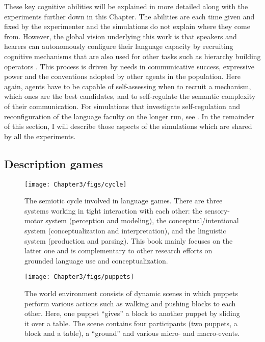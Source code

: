 These key cognitive abilities will be explained in more detailed along with the experiments further down in this Chapter. The abilities are each time given and fixed by the experimenter and the simulations do not explain where they come from. However, the global vision underlying this work is that speakers and hearers can autonomously configure their language capacity by recruiting cognitive mechanisms that are also used for other tasks such as hierarchy building operators \citep{steels07recruitment}. This process is driven by needs in communicative success, expressive power and the conventions adopted by other agents in the population. Here again, agents have to be capable of self-assessing when to recruit a mechanism, which ones are the best candidates, and to self-regulate the semantic complexity of their communication. For simulations that investigate self-regulation and reconfiguration of the language faculty on the longer run, see \citet{steels06how-grammar, steels07scaffolding}. In the remainder of this section, I will describe those aspects of the simulations which are shared by all the experiments.

\subsection{Description games}

\begin{figure}[p]
\centerline{\texttt{[image: Chapter3/figs/cycle]}}
  \caption[The semiotic cycle]{The semiotic cycle involved in language games. There are three systems working in tight interaction with each other: the sensory-motor system (perception and modeling), the conceptual/intentional system (conceptualization and interpretation), and the linguistic system (production and parsing). This book mainly focuses on the latter one and is complementary to other research efforts on grounded language use and conceptualization.}
   \label{f:cycle}
\end{figure}

\begin{figure}[p]
\centerline{\texttt{[image: Chapter3/figs/puppets]}}
  \caption[An example scene]{The world environment consists of dynamic scenes in which puppets perform various actions such as walking and pushing blocks to each other. Here, one puppet ``gives'' a block to another puppet by sliding it over a table. The scene contains four participants (two puppets, a block and a table), a ``ground'' and various micro- and macro-events.}
   \label{f:puppets}
\end{figure}

